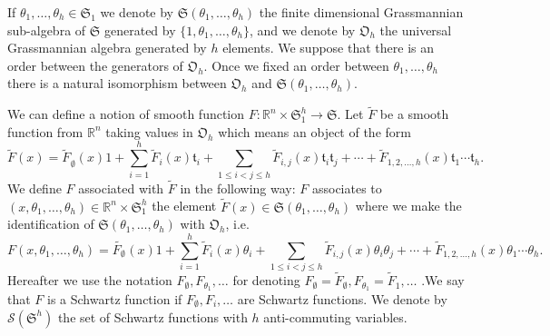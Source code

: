\documentclass[a4paper,10pt]{article}
\begin{document}
If $\theta_1, \ldots, \theta_h \in \mathfrak{S}_1$ we denote by $\mathfrak{S}
(\theta_1, \ldots, \theta_h)$ the finite dimensional Grassmannian sub-algebra
of $\mathfrak{S}$ generated by $\{ 1, \theta_1, \ldots, \theta_h \}$, and we
denote by $\mathfrak{O}_h$ the universal Grassmannian algebra generated by $h$
elements. We suppose that there is an order between the generators of
$\mathfrak{O}_h$. Once we fixed an order between $\theta_1, \ldots, \theta_h$
there is a natural isomorphism between $\mathfrak{O}_h$ and $\mathfrak{S}
(\theta_1, \ldots, \theta_h)$.

We can define a notion of smooth function $F : \mathbb{R}^n \times
\mathfrak{S}_1^h \rightarrow \mathfrak{S}$. Let $\tilde{F}$ be a smooth
function from $\mathbb{R}^n$ taking values in $\mathfrak{O}_h$ which means an
object of the form
\[ \tilde{F} (x) = \widetilde{F_{}}_{\emptyset} (x) 1 + \sum_{i = 1}^h
   \tilde{F}_i (x) \mathfrak{t}_i + \sum_{1 \leqslant i < j \leqslant h}
   \tilde{F}_{i, j} (x) \mathfrak{t}_i \mathfrak{t}_j + \cdots + \tilde{F}_{1,
   2, \ldots, h} (x) \mathfrak{t}_1 \cdots \mathfrak{t}_h . \]
We define $F$ associated with $\tilde{F}$ in the following way: $F$ associates
to $(x, \theta_1, \ldots, \theta_h) \in \mathbb{R}^n \times \mathfrak{S}_1^h$
the element $\tilde{F} (x) \in \mathfrak{S} (\theta_1, \ldots, \theta_h)$
where we make the identification of $\mathfrak{S} (\theta_1, \ldots,
\theta_h)$ with $\mathfrak{O}_h$, i.e.
\[ F (x, \theta_1, \ldots, \theta_h) = \widetilde{F_{\emptyset}}_{} (x) 1 +
   \sum_{i = 1}^h \tilde{F}_i (x) \theta_i + \sum_{1 \leqslant i < j \leqslant
   h} \tilde{F}_{i, j} (x) \theta_i \theta_j + \cdots + \tilde{F}_{1, 2,
   \ldots, h} (x) \theta_1 \cdots \theta_h . \]
Hereafter we use the notation $F_{\emptyset}, F_{\theta_1}, \ldots$ for
denoting $F_{\emptyset} = \tilde{F}_{\emptyset}, F_{\theta_1} = \tilde{F}_1,
\ldots$ .We say that $F$ is a Schwartz function if $F_{\emptyset}, F_i,
\ldots$ are Schwartz functions. We denote by $\mathcal{S} (\mathfrak{S}^h)$
the set of Schwartz functions with $h$ anti-commuting variables.
\end{document}
